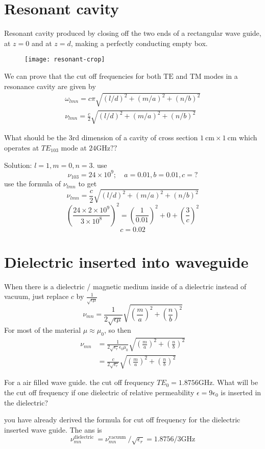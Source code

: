 \section{Resonant cavity}
Resonant cavity produced by closing off the two ends of a rectangular wave guide, at $z=0$ and at $z=d$, making a perfectly conducting empty box.\\
\begin{figure}[H]
	\centering
	\texttt{[image: resonant-crop]}
	\caption{}
	\label{}
\end{figure}
We can prove that the cut off frequencies for both $\mathrm{TE}$ and TM modes in a resonance cavity are given by
$$\begin{gathered}
\omega_{l m n}=c \pi \sqrt{(l / d)^{2}+(m / a)^{2}+(n / b)^{2}} \\
\nu_{l m n}=\frac{c}{2} \sqrt{(l / d)^{2}+(m / a)^{2}+(n / b)^{2}}
\end{gathered}$$
\begin{exercise}
	 What should be the 3rd dimension of a cavity of cross section $1 \mathrm{~cm} \times 1 \mathrm{~cm}$ which operates at $T E_{103}$ mode at $24 \mathrm{GHz} ? ?$
\end{exercise}
\begin{answer}
Solution: $l=1, m=0, n=3$. use
$$
\nu_{103}=24 \times 10^{9} ; \quad a=0.01, b=0.01, c=?
$$
use the formula of $\nu_{l m n}$ to get
$$\nu_{l m n}=\frac{c}{2} \sqrt{(l / d)^{2}+(m / a)^{2}+(n / b)^{2}}$$
$$
\left(\frac{24 \times 2 \times 10^{9}}{3 \times 10^{8}}\right)^{2}=\left(\frac{1}{0.01}\right)^{2}+0+\left(\frac{3}{c}\right)^{2}
$$
$$c=0.02$$	
\end{answer}
\section{ Dielectric inserted into waveguide}
When there is a dielectric / magnetic medium inside of a dielectric instead of vacuum, just replace $c$ by $\frac{1}{\sqrt{\epsilon \mu}}$
$$\nu_{m n}=\frac{1}{2 \sqrt{\epsilon \mu}} \sqrt{\left(\frac{m}{a}\right)^{2}+\left(\frac{n}{b}\right)^{2}}$$
For most of the material $\mu \approx \mu_{0}$, so then
$$
\begin{aligned}
\nu_{m n} &=\frac{1}{2 \sqrt{\epsilon_{r}} \epsilon_{0} \mu_{0}} \sqrt{\left(\frac{m}{a}\right)^{2}+\left(\frac{n}{b}\right)^{2}} \\
&=\frac{c}{2 \sqrt{\epsilon_{r}}} \sqrt{\left(\frac{m}{a}\right)^{2}+\left(\frac{n}{b}\right)^{2}}
\end{aligned}
$$
\begin{exercise}
 For a air filled wave guide. the cut off frequency $T E_{0}=1.8756 \mathrm{GHz}$. What will be the cut off frequency if one dielectric of relative permeability $\epsilon=9 \epsilon_{0}$ is inserted in the dielectric?
\end{exercise}
\begin{answer}
 you have already derived the formula for cut off frequency for the dielectric inserted wave guide. The ans is
$$
\nu_{m n}^{\text {dielectric }}=\nu_{m n}^{\text {vacuum }} / \sqrt{\epsilon_{r}}=1.8756 / 3 \mathrm{GHz}
$$	
\end{answer}






